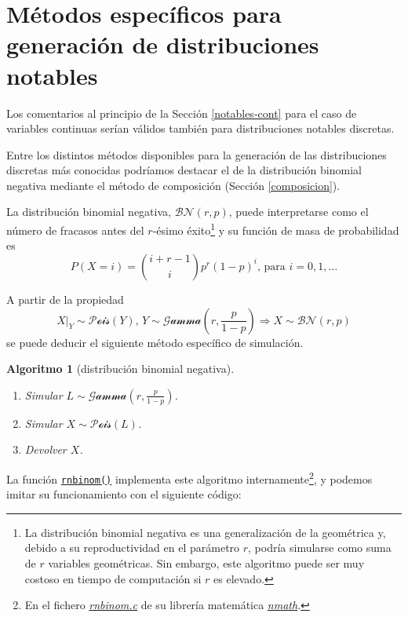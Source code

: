 \documentclass[
  spanish,
  10pt,
]{book}
\theoremstyle{break}
\newtheorem{conjecture}{Algoritmo}[chapter]
\theoremstyle{nonumberplain}
\let\oldfootnote\footnote
\renewcommand\footnote[1]{\oldfootnote{\hspace{2mm}#1}}
\begin{document}
\section{Métodos específicos para generación de distribuciones notables}\label{notables-disc}

Los comentarios al principio de la Sección \ref{notables-cont} para el caso de variables continuas serían válidos también para distribuciones notables discretas.

Entre los distintos métodos disponibles para la generación de las distribuciones discretas más conocidas podríamos destacar el de la distribución binomial negativa mediante el método de composición (Sección \ref{composicion}).

La distribución binomial negativa, \(\mathcal{BN}(r, p)\), puede interpretarse como el número de fracasos antes del \(r\)-ésimo éxito\footnote{La distribución binomial negativa es una generalización de la geométrica y, debido a su reproductividad en el parámetro \(r\), podría simularse como suma de \(r\) variables geométricas. Sin embargo, este algoritmo puede ser muy costoso en tiempo de computación si \(r\) es elevado.} y su función de masa de probabilidad es
\[P(X = i) = \binom{i+r-1}i p^r (1-p)^i \text{, para }i=0,1,\ldots\]

A partir de la propiedad \citep[ver e.g.][pp.~488-489]{devroye1986}
\[X|_{Y} \sim \mathcal{Pois}\left(  Y\right)  \text{, }Y \sim \mathcal{Gamma} \left( r, \frac{p}{1-p}\right)  \Rightarrow X \sim \mathcal{BN}(r, p)\]
se puede deducir el siguiente método específico de simulación.

\begin{conjecture}[distribución binomial negativa]
\protect\hypertarget{cnj:bin-neg}{}\label{cnj:bin-neg}

\begin{enumerate}
\def\labelenumi{\arabic{enumi}.}
\item
  Simular \(L \sim \mathcal{Gamma}\left( r, \frac{p}{1-p} \right)\).
\item
  Simular \(X \sim \mathcal{Pois} \left(  L\right)\).
\item
  Devolver \(X\).
\end{enumerate}

\end{conjecture}

La función \href{https://rdrr.io/r/stats/NegBinomial.html}{\texttt{rnbinom()}} implementa este algoritmo internamente\footnote{En el fichero \href{https://svn.r-project.org/R/trunk/src/nmath/rnbinom.c}{\emph{rnbinom.c}} de su librería matemática \href{https://svn.r-project.org/R/trunk/src/nmath}{\emph{nmath}}.},
y podemos imitar su funcionamiento con el siguiente código:
\end{document}
